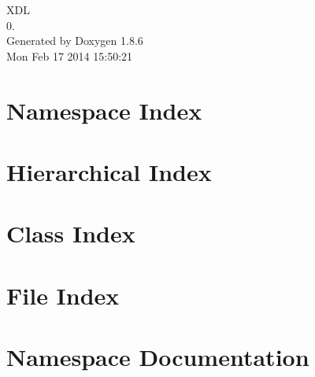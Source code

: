 \documentclass[twoside]{book}
\newcommand{\clearemptydoublepage}{%
  \newpage{\pagestyle{empty}\cleardoublepage}%
}
\begin{document}
\hypersetup{pageanchor=false}
\begin{titlepage}
\vspace*{7cm}
\begin{center}%
{\Large X\-D\-L \\[1ex]\large 0. }\\
\vspace*{1cm}
{\large Generated by Doxygen 1.8.6}\\
\vspace*{0.5cm}
{\small Mon Feb 17 2014 15:50:21}\\
\end{center}
\end{titlepage}
\clearemptydoublepage
\tableofcontents
\clearemptydoublepage
{}
\hypersetup{pageanchor=true}

\chapter{Namespace Index}

\chapter{Hierarchical Index}

\chapter{Class Index}

\chapter{File Index}

\chapter{Namespace Documentation}

\end{document}
